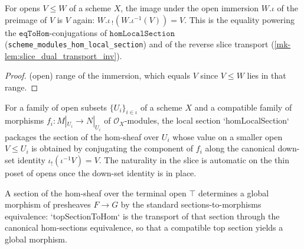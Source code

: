 \begin{lemma}[Down-set image identity \(\iota_!(\iota^{-1}V) = V\)]\label{mk-lem:image_preimage_of_le}
  \leanok

  For opens \(V \le W\) of a scheme \(X\), the image under the open immersion \(W.\iota\) of
  the preimage of \(V\) is \(V\) again: \(W.\iota\,{}_!(W.\iota^{-1}(V)) = V\). This is the
  equality powering the \(\mathtt{eqToHom}\)-conjugations of \(\mathtt{homLocalSection}\)
  (\texttt{scheme\_modules\_hom\_local\_section}) and of the reverse slice transport
  (\ref{mk-lem:slice_dual_transport_inv}).
\end{lemma}
\begin{proof}
  \leanok
  (open) range of the immersion, which equals \(V\) since \(V \le W\) lies in that range.
\end{proof}

\begin{definition}\label{mk-def:scheme_modules_hom_local_section}
  \leanok

  For a family of open subsets \(\{U_i\}_{i \in \iota}\) of a scheme \(X\) and a compatible
  family of morphisms \(f_i : M|_{U_i} \to N|_{U_i}\) of \(\mathcal{O}_X\)-modules, the
  local section `homLocalSection` packages the section of the hom-sheaf over \(U_i\) whose
  value on a smaller open \(V \le U_i\) is obtained by conjugating the component of \(f_i\)
  along the canonical down-set identity \(\iota_!(\iota^{-1}V) = V\). The naturality in the
  slice is automatic on the thin poset of opens once the down-set identity is in place.
\end{definition}

\begin{definition}\label{mk-def:scheme_modules_top_section_to_hom}
  \leanok

  A section of the hom-sheaf over the terminal open \(\top\) determines a global
  morphism of presheaves \(F \to G\) by the standard sections-to-morphisms equivalence:
  `topSectionToHom` is the transport of that section through the canonical
  hom-sections equivalence, so that a compatible top section yields a global morphism.
\end{definition}

